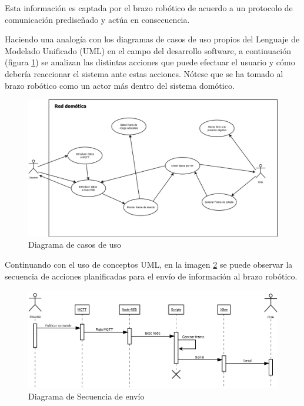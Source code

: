Esta información es captada por el brazo robótico de acuerdo a un protocolo de comunicación prediseñado y actúa en consecuencia.

Haciendo una analogía con los diagramas de casos de uso propios del Lenguaje de Modelado Unificado (UML) en el campo del desarrollo software, a continuación (figura \ref{fig:diacasos}) se analizan las distintas acciones que puede efectuar el usuario y cómo debería reaccionar el sistema ante estas acciones. Nótese que se ha tomado al brazo robótico como un actor más dentro del sistema domótico.

\begin{figure}[tb]
\centering
\includegraphics[width=1\textwidth]{figuras/DiaCasos.png}
\caption{Diagrama de casos de uso}
\label{fig:diacasos}
\end{figure}

Continuando con el uso de conceptos UML, en la imagen \ref{fig:diasecuencia} se puede observar la secuencia de acciones planificadas para el envío de información al brazo robótico.

\begin{figure}[tb]
\centering
\includegraphics[width=1\textwidth]{figuras/DiaSecuencia.png}
\caption{Diagrama de Secuencia de envío}
\label{fig:diasecuencia}
\end{figure}

